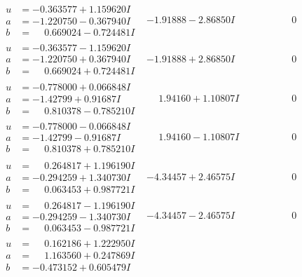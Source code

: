 \documentclass[1p]{elsarticle_modified}
\theoremstyle{definition}
\begin{document}
$$\begin{array}{c|c|c}
\begin{aligned}
u &= -0.363577 + 1.159620 I \\
a &= -1.220750 - 0.367940 I \\
b &= \phantom{-}0.669024 - 0.724481 I\end{aligned}
 & -1.91888 - 2.86850 I & \phantom{-0.000000 } 0 \\ \hline\begin{aligned}
u &= -0.363577 - 1.159620 I \\
a &= -1.220750 + 0.367940 I \\
b &= \phantom{-}0.669024 + 0.724481 I\end{aligned}
 & -1.91888 + 2.86850 I & \phantom{-0.000000 } 0 \\ \hline\begin{aligned}
u &= -0.778000 + 0.066848 I \\
a &= -1.42799 + 0.91687 I \\
b &= \phantom{-}0.810378 - 0.785210 I\end{aligned}
 & \phantom{-}1.94160 + 1.10807 I & \phantom{-0.000000 } 0 \\ \hline\begin{aligned}
u &= -0.778000 - 0.066848 I \\
a &= -1.42799 - 0.91687 I \\
b &= \phantom{-}0.810378 + 0.785210 I\end{aligned}
 & \phantom{-}1.94160 - 1.10807 I & \phantom{-0.000000 } 0 \\ \hline\begin{aligned}
u &= \phantom{-}0.264817 + 1.196190 I \\
a &= -0.294259 + 1.340730 I \\
b &= \phantom{-}0.063453 + 0.987721 I\end{aligned}
 & -4.34457 + 2.46575 I & \phantom{-0.000000 } 0 \\ \hline\begin{aligned}
u &= \phantom{-}0.264817 - 1.196190 I \\
a &= -0.294259 - 1.340730 I \\
b &= \phantom{-}0.063453 - 0.987721 I\end{aligned}
 & -4.34457 - 2.46575 I & \phantom{-0.000000 } 0 \\ \hline\begin{aligned}
u &= \phantom{-}0.162186 + 1.222950 I \\
a &= \phantom{-}1.163560 + 0.247869 I \\
b &= -0.473152 + 0.605479 I\end{aligned}

\end{array}$$
\end{document}
